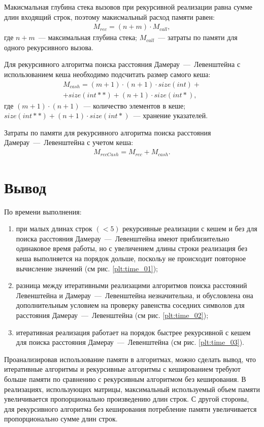 Макисмальная глубина стека вызовов при рекурсивной реализации равна сумме длин входящий строк, поэтому макисмальный расход памяти равен:
\begin{equation}
	\begin{aligned}
		M_{rec} = (n + m) \cdot M_{call},
	\end{aligned}
\end{equation}
где $n + m$~--- максимальная глубина стека;
\newline $M_{call}$~--- затраты по памяти для одного рекурсивного вызова.

Для рекурсивного алгоритма поиска расстояния Дамерау~---~Левенштейна с использованием кеша необходимо подсчитать размер самого кеша:
\begin{multline}
	M_{cash} = (m + 1) \cdot (n + 1) \cdot size(int) + \\ + size(int **) + (n + 1) \cdot size(int *),
\end{multline}
где $(m + 1) \cdot (n + 1)$~--- количество элементов в кеше;
\newline $size(int **) + (n + 1) \cdot size(int *)$~--- хранение указателей.

Затраты по памяти для рекурсивного алгоритма поиска расстояния Дамерау~---~Левенштейна с учетом кеша: 
\begin{equation}
	\label{}
	\begin{aligned}
		M_{recCash} = M_{rec} + M_{cash}.
	\end{aligned}
\end{equation}

\section{Вывод}

По времени выполнения:
\begin{enumerate}
	\item при малых длинах строк $(< 5)$ рекурсивные реализации с кешем и без для поиска расстояния Дамерау~---~Левенштейна имеют приблизительно одинаковое время работы, 
	но с увеличением длины строки реализация без кеша выполняется на порядок дольше, поскольу не происходит повторное вычисление значений (см рис. \ref{plt:time_01});
	\item разница между итеративными реализацими алгоритмов поиска расстояний Левенштейна и Дамерау~---~Левенштейна незначительна, и обусловлена она
	дополнительным условием на проверку равенства соседних символов для расстояния Дамерау~---~Левенштейна (см рис. \ref{plt:time_02});
	\item итеративная реализация работает на порядок быстрее рекурсивной с кешем для поиска расстояния Дамерау~---~Левенштейна (см рис. \ref{plt:time_03}).
\end{enumerate}

Проанализировав использование памяти в алгоритмах, можно сделать вывод, что итеративные алгоритмы и рекурсивные алгоритмы с кешированием требуют больше памяти по сравнению с рекурсивным алгоритмом без кеширования. 
В реализациях, использующих матрицы, максимальный используемый объем памяти увеличивается пропорционально произведению длин строк. С другой стороны, для рекурсивного алгоритма без кеширования потребление памяти 
увеличивается пропорционально сумме длин строк.